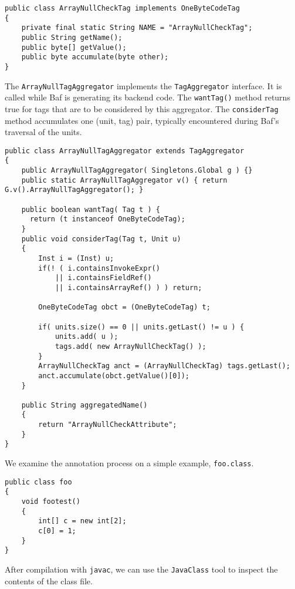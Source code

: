 \documentclass{article}
\begin{document}
\begin{verbatim}
public class ArrayNullCheckTag implements OneByteCodeTag
{
    private final static String NAME = "ArrayNullCheckTag";
    public String getName();
    public byte[] getValue();
    public byte accumulate(byte other);
}
\end{verbatim}

The {\tt ArrayNullTagAggregator} implements the {\tt TagAggregator}
interface.  It is called while Baf is generating its backend code.
The {\tt wantTag()} method returns true for tags that are to be considered
by this aggregator.
The {\tt considerTag}
method accumulates one (unit, tag) pair, typically encountered
during Baf's traversal of the units.

\begin{verbatim}
public class ArrayNullTagAggregator extends TagAggregator
{    
    public ArrayNullTagAggregator( Singletons.Global g ) {}
    public static ArrayNullTagAggregator v() { return G.v().ArrayNullTagAggregator(); }

    public boolean wantTag( Tag t ) {
      return (t instanceof OneByteCodeTag);
    }
    public void considerTag(Tag t, Unit u)
    {
        Inst i = (Inst) u;
        if(! ( i.containsInvokeExpr()
            || i.containsFieldRef()
            || i.containsArrayRef() ) ) return;

        OneByteCodeTag obct = (OneByteCodeTag) t;

        if( units.size() == 0 || units.getLast() != u ) {
            units.add( u );
            tags.add( new ArrayNullCheckTag() );
        }
        ArrayNullCheckTag anct = (ArrayNullCheckTag) tags.getLast();
        anct.accumulate(obct.getValue()[0]);
    }
    
    public String aggregatedName()
    {
        return "ArrayNullCheckAttribute"; 
    }
}
\end{verbatim}

We examine the annotation process on a simple example, {\tt foo.class}.

\begin{verbatim}
public class foo
{    
    void footest()
    {        
        int[] c = new int[2];
        c[0] = 1;
    }
}
\end{verbatim}

After compilation with {\tt javac}, we can use the {\tt JavaClass}
tool to inspect the contents of the class file.
\end{document}
